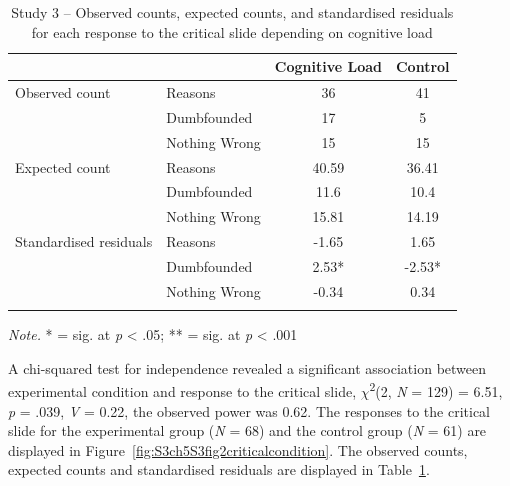 \documentclass[
  american,
  man,floatsintext]{apa7}
\begin{document}
\begin{table}[tbp]

\begin{center}
\begin{threeparttable}

\caption{\label{tab:S3S3tab1dumb}Study 3 – Observed counts, expected counts, and standardised residuals for each response to the critical slide depending on cognitive load}

\begin{tabular}{llcc}
\toprule
 & \multicolumn{1}{c}{} & \multicolumn{1}{c}{Cognitive Load} & \multicolumn{1}{c}{Control}\\
\midrule
Observed count & Reasons & 36 & 41\\
 & Dumbfounded & 17 & 5\\
 & Nothing Wrong & 15 & 15\\
Expected count & Reasons & 40.59 & 36.41\\
 & Dumbfounded & 11.6 & 10.4\\
 & Nothing Wrong & 15.81 & 14.19\\
Standardised residuals & Reasons & -1.65 & 1.65\\
 & Dumbfounded & 2.53* & -2.53*\\
 & Nothing Wrong & -0.34 & 0.34\\
\bottomrule
\addlinespace
\end{tabular}

\begin{tablenotes}[para]
\normalsize{\textit{Note.} * = sig. at \emph{p} < .05; ** = sig. at \emph{p} < .001}
\end{tablenotes}

\end{threeparttable}
\end{center}

\end{table}

A chi-squared test for independence revealed a significant association between experimental condition and response to the critical slide, \(\chi\)\textsuperscript{2}(2, \emph{N} = 129) = 6.51, \emph{p} = .039, \emph{V} = 0.22, the observed power was 0.62. The responses to the critical slide for the experimental group (\emph{N} = 68) and the control group (\emph{N} = 61) are displayed in Figure~\ref{fig:S3ch5S3fig2criticalcondition}. The observed counts, expected counts and standardised residuals are displayed in Table~\ref{tab:S3S3tab1dumb}.

\newpage
\end{document}
